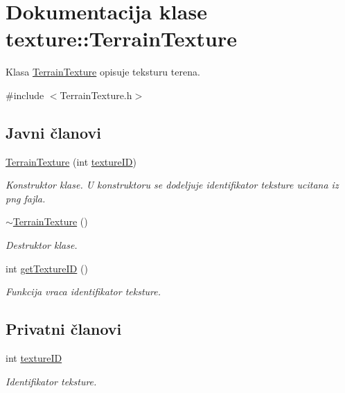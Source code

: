 \hypertarget{classtexture_1_1TerrainTexture}{}\section{Dokumentacija klase texture\+:\+:Terrain\+Texture}
\label{classtexture_1_1TerrainTexture}


Klasa \hyperlink{classtexture_1_1TerrainTexture}{Terrain\+Texture} opisuje teksturu terena.  




{\ttfamily \#include $<$Terrain\+Texture.\+h$>$}

\subsection*{Javni članovi}
\begin{DoxyCompactItemize}
\item 
\hyperlink{classtexture_1_1TerrainTexture_a2aad4f05e7941835c0b9f851a32ee455}{Terrain\+Texture} (int \hyperlink{classtexture_1_1TerrainTexture_a52da27a891185b2df83c4e1c62fde3c6}{texture\+ID})
\begin{DoxyCompactList}\small\item\em Konstruktor klase. U konstruktoru se dodeljuje identifikator teksture ucitana iz png fajla. \end{DoxyCompactList}\item 
\hyperlink{classtexture_1_1TerrainTexture_a461b011cd3b6ee4b48b083c1705d0113}{$\sim$\+Terrain\+Texture} ()
\begin{DoxyCompactList}\small\item\em Destruktor klase. \end{DoxyCompactList}\item 
int \hyperlink{classtexture_1_1TerrainTexture_a01ad68289523fa583d2892cf44d39b23}{get\+Texture\+ID} ()
\begin{DoxyCompactList}\small\item\em Funkcija vraca identifikator teksture. \end{DoxyCompactList}\end{DoxyCompactItemize}
\subsection*{Privatni članovi}
\begin{DoxyCompactItemize}
\item 
int \hyperlink{classtexture_1_1TerrainTexture_a52da27a891185b2df83c4e1c62fde3c6}{texture\+ID}
\begin{DoxyCompactList}\small\item\em Identifikator teksture. \end{DoxyCompactList}\end{DoxyCompactItemize}


